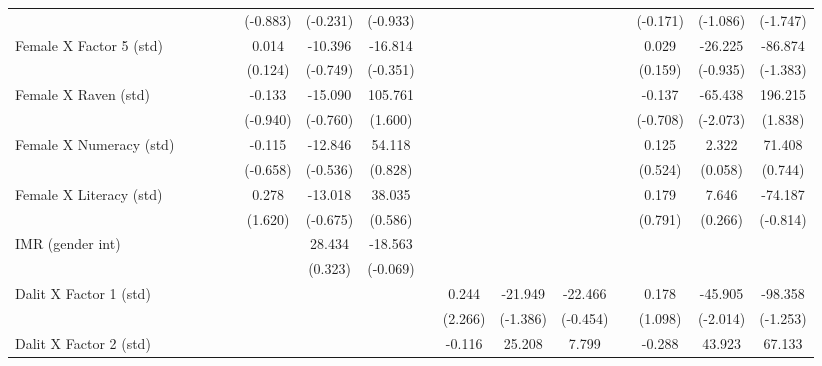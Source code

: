 {\begin{longtable}{@{\extracolsep{\fill}}lccccccccccccccc}
          &       &       &       &       & (-0.883) & (-0.231) & (-0.933) &       &       &       &       &       & (-0.171) & (-1.086) & (-1.747) \\
    Female X Factor 5 (std) &       &       &       &       & 0.014 & -10.396 & -16.814 &       &       &       &       &       & 0.029 & -26.225 & -86.874 \\
          &       &       &       &       & (0.124) & (-0.749) & (-0.351) &       &       &       &       &       & (0.159) & (-0.935) & (-1.383) \\
    Female X Raven (std) &       &       &       &       & -0.133 & -15.090 & 105.761 &       &       &       &       &       & -0.137 & -65.438 & 196.215 \\
          &       &       &       &       & (-0.940) & (-0.760) & (1.600) &       &       &       &       &       & (-0.708) & (-2.073) & (1.838) \\
    Female X Numeracy (std) &       &       &       &       & -0.115 & -12.846 & 54.118 &       &       &       &       &       & 0.125 & 2.322 & 71.408 \\
          &       &       &       &       & (-0.658) & (-0.536) & (0.828) &       &       &       &       &       & (0.524) & (0.058) & (0.744) \\
    Female X Literacy (std) &       &       &       &       & 0.278 & -13.018 & 38.035 &       &       &       &       &       & 0.179 & 7.646 & -74.187 \\
          &       &       &       &       & (1.620) & (-0.675) & (0.586) &       &       &       &       &       & (0.791) & (0.266) & (-0.814) \\
    IMR (gender int) &       &       &       &       &       & 28.434 & -18.563 &       &       &       &       &       &       &       &  \\
          &       &       &       &       &       & (0.323) & (-0.069) &       &       &       &       &       &       &       &  \\
    Dalit X Factor 1 (std) &       &       &       &       &       &       &       &       & 0.244 & -21.949 & -22.466 &       & 0.178 & -45.905 & -98.358 \\
          &       &       &       &       &       &       &       &       & (2.266) & (-1.386) & (-0.454) &       & (1.098) & (-2.014) & (-1.253) \\
    Dalit X Factor 2 (std) &       &       &       &       &       &       &       &       & -0.116 & 25.208 & 7.799 &       & -0.288 & 43.923 & 67.133 \\

\end{longtable}}
